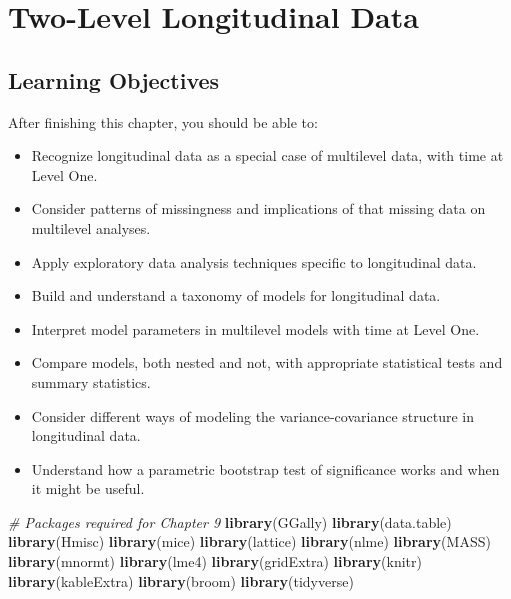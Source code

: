 \documentclass[
]{krantz}
\newenvironment{Shaded}{\begin{snugshade}}{\end{snugshade}}
\newcommand{\CommentTok}[1]{\textcolor[rgb]{0.37,0.37,0.37}{\textit{#1}}}
\newcommand{\FunctionTok}[1]{\textcolor[rgb]{0.27,0.27,0.27}{\textbf{#1}}}
\newcommand{\NormalTok}[1]{#1}
\providecommand{\tightlist}{%
  \setlength{\itemsep}{0pt}\setlength{\parskip}{0pt}}
\begin{document}
\chapter{Two-Level Longitudinal Data}\label{ch-lon}

\section{Learning Objectives}\label{learning-objectives-8}

After finishing this chapter, you should be able to:

\begin{itemize}
\tightlist
\item
  Recognize longitudinal data as a special case of multilevel data, with time at Level One.
\item
  Consider patterns of missingness and implications of that missing data on multilevel analyses.
\item
  Apply exploratory data analysis techniques specific to longitudinal data.
\item
  Build and understand a taxonomy of models for longitudinal data.
\item
  Interpret model parameters in multilevel models with time at Level One.
\item
  Compare models, both nested and not, with appropriate statistical tests and summary statistics.
\item
  Consider different ways of modeling the variance-covariance structure in longitudinal data.
\item
  Understand how a parametric bootstrap test of significance works and when it might be useful.
\end{itemize}

\begin{Shaded}
\begin{Highlighting}[]
\CommentTok{\# Packages required for Chapter 9}
\FunctionTok{library}\NormalTok{(GGally)}
\FunctionTok{library}\NormalTok{(data.table)}
\FunctionTok{library}\NormalTok{(Hmisc)}
\FunctionTok{library}\NormalTok{(mice)}
\FunctionTok{library}\NormalTok{(lattice)}
\FunctionTok{library}\NormalTok{(nlme)}
\FunctionTok{library}\NormalTok{(MASS)}
\FunctionTok{library}\NormalTok{(mnormt)}
\FunctionTok{library}\NormalTok{(lme4)}
\FunctionTok{library}\NormalTok{(gridExtra) }
\FunctionTok{library}\NormalTok{(knitr)}
\FunctionTok{library}\NormalTok{(kableExtra)}
\FunctionTok{library}\NormalTok{(broom)}
\FunctionTok{library}\NormalTok{(tidyverse)}
\end{Highlighting}
\end{Shaded}
\end{document}
